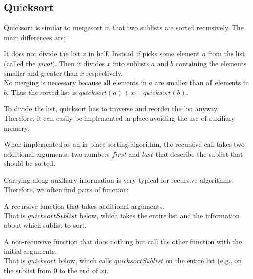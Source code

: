 \subsection{Quicksort}\label{sec:ad:sort:quick}

Quicksort is similar to mergesort in that two sublists are sorted recursively.
The main differences are:
\begin{compactitem}
 \item It does not divide the list $x$ in half.
  Instead if picks some element $a$ from the list (called the \emph{pivot}).
  Then it divides $x$ into sublists $a$ and $b$ containing the elements smaller and greater than $x$ respectively.\\
  No merging is necessary because all elements in $a$ are smaller than all elements in $b$.
  Thus the sorted list is $quicksort(a)+x+quicksort(b)$.
 \item To divide the list, quicksort has to traverse and reorder the list anyway.
 Therefore, it can easily be implemented in-place avoiding the use of auxiliary memory.
\end{compactitem}

When implemented as an in-place sorting algorithm, the recursive call takes two additional arguments: two numbers $first$ and $last$ that describe the sublist that should be sorted.

\begin{remark}
Carrying along auxiliary information is very typical for recursive algorithms.
Therefore, we often find pairs of function:
 \begin{compactitem}
  \item A recursive function that takes additional arguments.\\
   That is $quicksortSublist$ below, which takes the entire list and the information about which sublist to sort.
  \item A non-recursive function that does nothing but call the other function with the initial arguments.\\
   That is $quicksort$ below, which calls $quicksortSublist$ on the entire list (e.g., on the sublist from $0$ to the end of $x$).
 \end{compactitem}
\end{remark}


